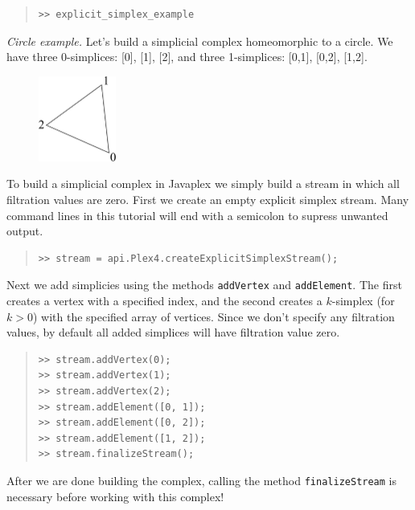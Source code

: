 \documentclass[amscd, amssymb, verbatim]{amsart}[12pt]
\theoremstyle{remark}
\theoremstyle{remark}
\theoremstyle{remark}
\begin{document}
\begin{quote} \begin{verbatim} 
>> explicit_simplex_example
\end{verbatim} \end{quote}

{\em Circle example.} Let's build a simplicial complex homeomorphic to a circle. We have three 0-simplices: [0], [1], [2], and three 1-simplices: [0,1], [0,2], [1,2].

\begin{figure}[htp]
  	\begin{center}
    	\includegraphics[width=1in]{s1.pdf}
   	\end{center}
\end{figure}
\FloatBarrier

To build a simplicial complex in Javaplex we simply build a stream in which all filtration values are zero. First we create an empty explicit simplex stream. Many command lines in this tutorial will end with a semicolon to supress unwanted output.

\begin{quote} \begin{verbatim} 
>> stream = api.Plex4.createExplicitSimplexStream();
\end{verbatim} \end{quote}

Next we add simplicies using the methods \texttt{addVertex} and \texttt{addElement}. The first creates a vertex with a specified index, and the second creates a $k$-simplex (for $k >0$) with the specified array of vertices. Since we don't specify any filtration values, by default all added simplices will have filtration value zero.

\begin{quote} \begin{verbatim}
>> stream.addVertex(0);
>> stream.addVertex(1);
>> stream.addVertex(2);
>> stream.addElement([0, 1]);
>> stream.addElement([0, 2]);
>> stream.addElement([1, 2]);
>> stream.finalizeStream();
\end{verbatim} \end{quote}

After we are done building the complex, calling the method \texttt{finalizeStream} is necessary before working with this complex!
\end{document}
